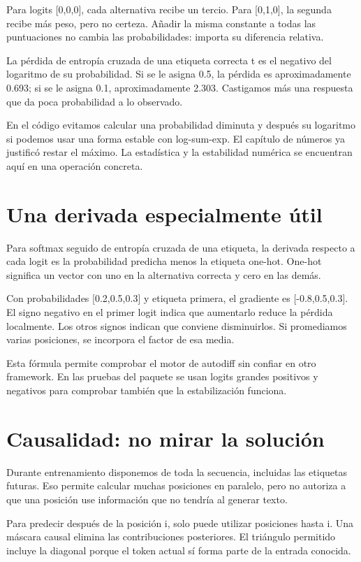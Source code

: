 \documentclass[12pt,a4paper,oneside]{report}
\begin{document}
Para logits [0,0,0], cada alternativa recibe un tercio. Para [0,1,0], la segunda recibe más peso, pero no certeza. Añadir la misma constante a todas las puntuaciones no cambia las probabilidades: importa su diferencia relativa.

La pérdida de entropía cruzada de una etiqueta correcta t es el negativo del logaritmo de su probabilidad. Si se le asigna 0.5, la pérdida es aproximadamente 0.693; si se le asigna 0.1, aproximadamente 2.303. Castigamos más una respuesta que da poca probabilidad a lo observado.

En el código evitamos calcular una probabilidad diminuta y después su logaritmo si podemos usar una forma estable con log-sum-exp. El capítulo de números ya justificó restar el máximo. La estadística y la estabilidad numérica se encuentran aquí en una operación concreta.

\section{Una derivada especialmente útil}
Para softmax seguido de entropía cruzada de una etiqueta, la derivada respecto a cada logit es la probabilidad predicha menos la etiqueta one-hot. One-hot significa un vector con uno en la alternativa correcta y cero en las demás.

Con probabilidades [0.2,0.5,0.3] y etiqueta primera, el gradiente es [-0.8,0.5,0.3]. El signo negativo en el primer logit indica que aumentarlo reduce la pérdida localmente. Los otros signos indican que conviene disminuirlos. Si promediamos varias posiciones, se incorpora el factor de esa media.

Esta fórmula permite comprobar el motor de autodiff sin confiar en otro framework. En las pruebas del paquete se usan logits grandes positivos y negativos para comprobar también que la estabilización funciona.

\section{Causalidad: no mirar la solución}
Durante entrenamiento disponemos de toda la secuencia, incluidas las etiquetas futuras. Eso permite calcular muchas posiciones en paralelo, pero no autoriza a que una posición use información que no tendría al generar texto.

Para predecir después de la posición i, solo puede utilizar posiciones hasta i. Una máscara causal elimina las contribuciones posteriores. El triángulo permitido incluye la diagonal porque el token actual sí forma parte de la entrada conocida.
\end{document}
